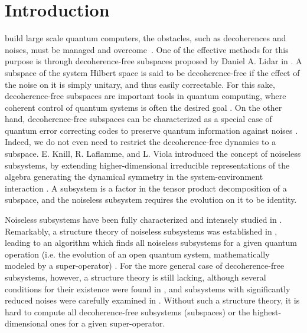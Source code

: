 \documentclass[journal]{IEEEtran}
\begin{document}
 \IEEEpeerreviewmaketitle

\section{Introduction}
 build large scale quantum computers, the obstacles, such as decoherences and noises,  must be managed and overcome~\cite{nielsen2010quantum}. One of the effective methods for this purpose is through
decoherence-free subspaces proposed by Daniel A. Lidar in \cite{lidar1998decoherence}. A subspace of the system Hilbert space is said to be decoherence-free if the effect of the noise on it is simply unitary, and thus easily correctable. For this sake, decoherence-free subspaces are important tools in quantum computing, where coherent control of quantum systems is often the desired goal \cite{lidar2012review}. On the other hand, decoherence-free subspaces  can be characterized as a special case of quantum error correcting codes to preserve quantum information against noises \cite{lidar2012review}. Indeed, we do not even need to restrict the decoherence-free dynamics to a subspace. E. Knill, R. Laflamme, and L. Viola introduced  the concept of noiseless subsystems, by extending higher-dimensional irreducible representations of the algebra generating the dynamical symmetry in the system-environment interaction \cite{knill2000theory}. A subsystem is a factor in the tensor product decomposition of a subspace, and 
the noiseless subsystem requires the evolution on it to be identity. 

Noiseless subsystems have been fully characterized and intensely studied in \cite{choi2006method,blume2010information,beny2007generalization,kribs2006quantum,kribs2005unified}. Remarkably, a structure theory of noiseless subsystems  was established in \cite{choi2006method}, leading to an algorithm which finds all noiseless subsystems for a given quantum operation (i.e. the evolution of an open quantum system, mathematically modeled by a super-operator) \cite{knill2006protected,wang2013numerical}. For the more general case of decoherence-free subsystems, however, a structure theory is still lacking, although several conditions for their existence were found in \cite{shabani2005theory}, and subsystems with significantly reduced noises  were carefully examined in \cite{wang2016minimal}. Without such a structure theory, it is hard to compute all decoherence-free subsystems (subspaces) or the highest-dimensional ones for a given super-operator. 
\end{document}
